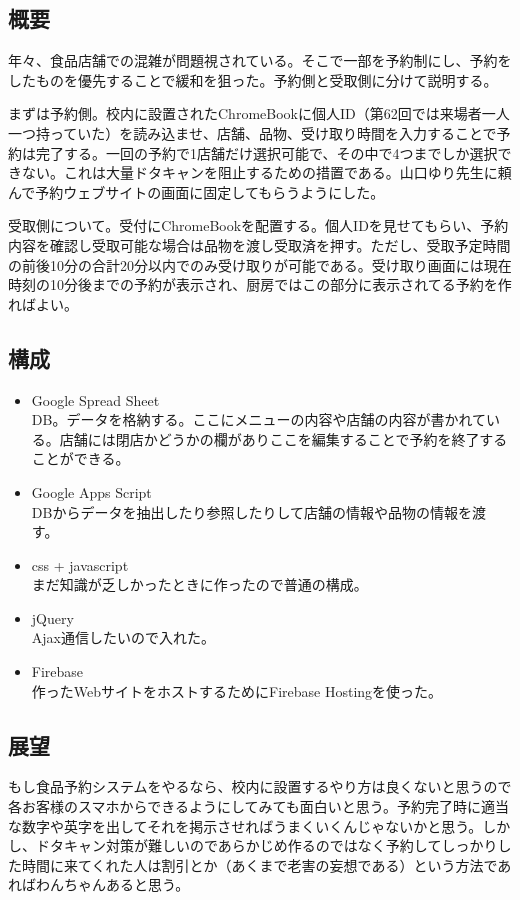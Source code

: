 \documentclass[dvipdfmx,jb5]{jreport}
\begin{document}
\subsection{概要}
年々、食品店舗での混雑が問題視されている。そこで一部を予約制にし、予約をしたものを優先することで緩和を狙った。予約側と受取側に分けて説明する。

まずは予約側。校内に設置されたChromeBookに個人ID（第62回では来場者一人一つ持っていた）を読み込ませ、店舗、品物、受け取り時間を入力することで予約は完了する。一回の予約で1店舗だけ選択可能で、その中で4つまでしか選択できない。これは大量ドタキャンを阻止するための措置である。山口ゆり先生に頼んで予約ウェブサイトの画面に固定してもらうようにした。

受取側について。受付にChromeBookを配置する。個人IDを見せてもらい、予約内容を確認し受取可能な場合は品物を渡し受取済を押す。ただし、受取予定時間の前後10分の合計20分以内でのみ受け取りが可能である。受け取り画面には現在時刻の10分後までの予約が表示され、厨房ではこの部分に表示されてる予約を作ればよい。

\subsection{構成}
\begin{itemize}
      \item Google Spread Sheet\\
            DB。データを格納する。ここにメニューの内容や店舗の内容が書かれている。店舗には閉店かどうかの欄がありここを編集することで予約を終了することができる。
      \item Google Apps Script\\
            DBからデータを抽出したり参照したりして店舗の情報や品物の情報を渡す。
      \item css + javascript\\
            まだ知識が乏しかったときに作ったので普通の構成。
      \item jQuery\\
            Ajax通信したいので入れた。
      \item Firebase\\
            作ったWebサイトをホストするためにFirebase Hostingを使った。
\end{itemize}
\subsection{展望}
もし食品予約システムをやるなら、校内に設置するやり方は良くないと思うので各お客様のスマホからできるようにしてみても面白いと思う。予約完了時に適当な数字や英字を出してそれを掲示させればうまくいくんじゃないかと思う。しかし、ドタキャン対策が難しいのであらかじめ作るのではなく予約してしっかりした時間に来てくれた人は割引とか（あくまで老害の妄想である）という方法であればわんちゃんあると思う。
\end{document}
